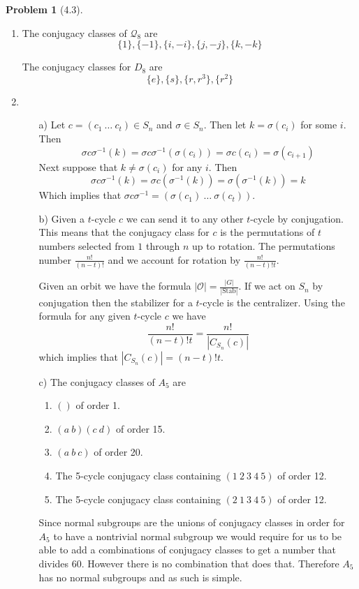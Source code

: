 \documentclass[10pt]{article}
\newcommand{\sk}{\vskip 10mm}
\theoremstyle{plain}
\newtheorem{problem}{Problem}
\theoremstyle{remark}
\begin{document}
\sk

\begin{problem}[4.3]
  
\end{problem}

\begin{enumerate}
\item The conjugacy classes of $\mathcal{Q}_8$ are
  \[ \{1\},\{-1\},\{i,-i\},\{j,-j\},\{k,-k\} \]

  The conjugacy classes for $D_8$ are
  \[ \{e\},\{s\},\{r,r^3\},\{r^2\}\]
\item
  \begin{itemize}
  \item[a)] Let $c=(c_1\ \ldots\ c_t)\in S_n$ and $\sigma\in S_n$. Then let
    $k=\sigma(c_i)$ for some $i$. Then
    \[ \sigma c\sigma^{-1}(k)=\sigma c\sigma^{-1}(\sigma(c_i))=\sigma c(c_i)=\sigma(c_{i+1})\]
    Next suppose that $k\neq\sigma(c_i)$ for any $i$. Then
    \[ \sigma c\sigma^{-1}(k)=\sigma c(\sigma^{-1}(k))=\sigma(\sigma^{-1}(k))=k\]
    Which implies that $\sigma c\sigma^{-1}=(\sigma(c_1)\ \ldots\ \sigma(c_t))$.
  \item[b)] Given a $t$-cycle $c$ we can send it to any other
    $t$-cycle by conjugation. This means that the conjugacy
    class for $c$ is the permutations of $t$ numbers selected
    from $1$ through $n$ up to rotation. The permutations
    number $\frac{n!}{(n-t)!}$ and we account for rotation
    by $\frac{n!}{(n-t)!t}$.

    Given an orbit we have the formula $|\mathcal{O}|=\frac{|G|}{|\text{Stab}|}$.
    If we act on $S_n$ by conjugation then the stabilizer for a $t$-cycle is
    the centralizer. Using the formula for any given $t$-cycle $c$ we have
    \[ \frac{n!}{(n-t)!t}=\frac{n!}{|C_{S_n}(c)|}\]
    which implies that $|C_{S_n}(c)|=(n-t)!t$.
  \item[c)] The conjugacy classes of $A_5$ are
    \begin{enumerate}
    \item $()$ of order 1.
    \item $(a\ b)(c\ d)$ of order 15.
    \item $(a\ b\ c)$ of order 20.
    \item The 5-cycle conjugacy class containing $(1\ 2\ 3\ 4\ 5)$ of order 12.
    \item The 5-cycle conjugacy class containing $(2\ 1\ 3\ 4\ 5)$ of order 12.
    \end{enumerate}

    Since normal subgroups are the unions of conjugacy classes in order for $A_5$ to have a nontrivial normal
    subgroup we would require for us to be able to add a combinations of conjugacy classes to get
    a number that divides 60. However there is no combination that does that.
    Therefore $A_5$ has no normal subgroups and as such is simple.
  \end{itemize}
\end{enumerate}
\end{document}

